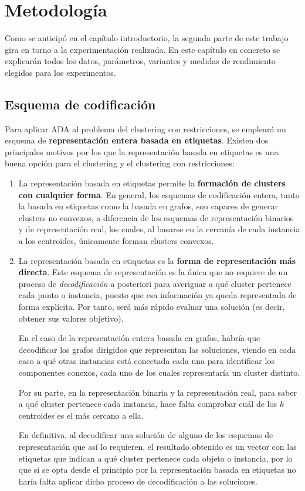 \chapter{Metodología}\label{ch:methodology}

Como se anticipó en el capítulo introductorio, la segunda parte de este trabajo gira en torno a la experimentación realizada. En este capítulo en concreto se explicarán todos los datos, parámetros, variantes y medidas de rendimiento elegidos para los experimentos.

\section{Esquema de codificación}

Para aplicar ADA al problema del clustering con restricciones, se empleará un esquema de \textbf{representación entera basada en etiquetas}. Existen dos principales motivos por los que la representación basada en etiquetas es una buena opción para el clustering y el clustering con restricciones:

\begin{enumerate}
 \item La representación basada en etiquetas permite la \textbf{formación de clusters con cualquier forma}. En general, los esquemas de codificación entera, tanto la basada en etiquetas como la basada en grafos, son capaces de generar clusters no convexos, a diferencia de los esquemas de representación binarios y de representación real, los cuales, al basarse en la cercanía de cada instancia a los centroides, únicamente forman clusters convexos.
 
 \item La representación basada en etiquetas es la \textbf{forma de representación más directa}. Este esquema de representación es la única que no requiere de un proceso de \emph{decodificación} a posteriori para averiguar a qué cluster pertenece cada punto o instancia, puesto que esa información ya queda representada de forma explícita. Por tanto, será más rápido evaluar una solución (es decir, obtener sus valores objetivo).
 
 En el caso de la representación entera basada en grafos, habría que decodificar los grafos dirigidos que representan las soluciones, viendo en cada caso a qué otras instancias está conectada cada una para identificar los componentes conexos, cada uno de los cuales representaría un cluster distinto.
 
 Por su parte, en la representación binaria y la representación real, para saber a qué cluster pertenece cada instancia, hace falta comprobar cuál de los $k$ centroides es el más cercano a ella.
 
 En definitiva, al decodificar una solución de alguno de los esquemas de representación que así lo requieren, el resultado obtenido es un vector con las etiquetas que indican a qué cluster pertenece cada objeto o instancia, por lo que si se opta desde el principio por la representación basada en etiquetas no haría falta aplicar dicho proceso de decodificación a las soluciones.
\end{enumerate}

